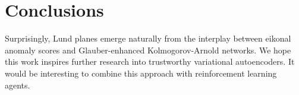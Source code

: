 \section{Conclusions}\label{sec:conclusions}

Surprisingly, Lund planes emerge naturally from the interplay between
eikonal anomaly scores and Glauber-enhanced Kolmogorov-Arnold networks.
We hope this work inspires further research into trustworthy variational
autoencoders. It would be interesting to combine this approach with
reinforcement learning agents.

